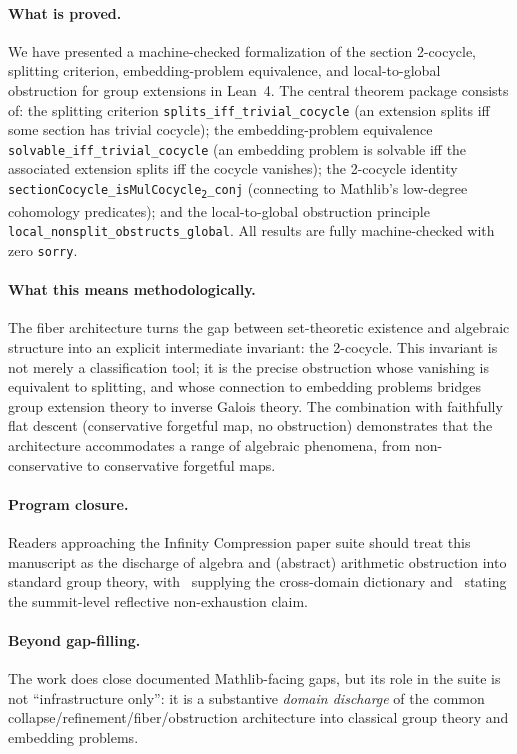 \documentclass[11pt]{article}
\newcommand{\lean}[1]{\texttt{#1}}
\begin{document}
\paragraph{What is proved.}
We have presented a machine-checked formalization of the section 2-cocycle,
splitting criterion, embedding-problem equivalence, and local-to-global
obstruction for group extensions in Lean~4. The central theorem package consists
of: the splitting criterion \lean{splits\_iff\_trivial\_cocycle} (an extension
splits iff some section has trivial cocycle); the embedding-problem equivalence
\lean{solvable\_iff\_trivial\_cocycle} (an embedding problem is solvable iff the
associated extension splits iff the cocycle vanishes); the 2-cocycle identity
\lean{sectionCocycle\_isMulCocycle\textsubscript{2}\_conj} (connecting to
Mathlib's low-degree cohomology predicates); and the local-to-global obstruction
principle \lean{local\_nonsplit\_obstructs\_global}. All results are fully
machine-checked with zero \lean{sorry}.

\paragraph{What this means methodologically.}
The fiber architecture turns the gap between set-theoretic existence and algebraic
structure into an explicit intermediate invariant: the 2-cocycle. This invariant
is not merely a classification tool; it is the precise obstruction whose vanishing
is equivalent to splitting, and whose connection to embedding problems bridges
group extension theory to inverse Galois theory. The combination with faithfully
flat descent (conservative forgetful map, no obstruction) demonstrates that the
architecture accommodates a range of algebraic phenomena, from non-conservative
to conservative forgetful maps.

\paragraph{Program closure.}
Readers approaching the Infinity Compression paper suite should treat this manuscript as
the discharge of algebra and (abstract) arithmetic obstruction into standard group theory,
with~\cite{SpivackSynthesis} supplying the cross-domain dictionary and~\cite{SpivackSummit}
stating the summit-level reflective non-exhaustion claim.

\paragraph{Beyond gap-filling.}
The work does close documented Mathlib-facing gaps, but its role in the suite is not
``infrastructure only'': it is a substantive \emph{domain discharge} of the common
collapse/refinement/fiber/obstruction architecture into classical group theory and embedding
problems.
\end{document}
